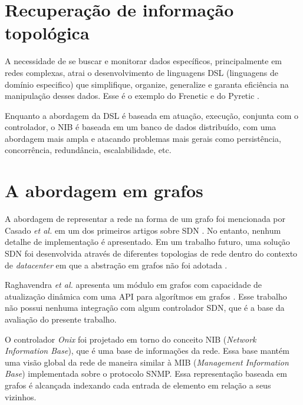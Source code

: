 \section{Recuperação de informação topológica}

A necessidade de se buscar e monitorar dados 
específicos, principalmente em redes complexas, atrai o desenvolvimento
de linguagens DSL (linguagens de domínio especifico) que simplifique, 
organize, generalize e garanta eficiência na manipulação desses dados.
Esse é o exemplo do Frenetic \citep{foster2011frenetic} 
e do Pyretic \citep{monsanto2013composing}.

Enquanto a abordagem da DSL é baseada em atuação, execução,
conjunta com o controlador,
o NIB é baseada em um banco de dados distribuído,
com uma abordagem mais ampla e atacando problemas mais gerais
como persistência, concorrência, redundância, escalabilidade, etc.

\section{A abordagem em grafos}

A abordagem de representar a rede na forma de um grafo foi mencionada 
por Casado \emph{et al.} em um dos primeiros artigos sobre SDN
\citep{martin2010virtualizing}.
No entanto, nenhum detalhe de implementação é apresentado.
Em um trabalho futuro, uma solução SDN foi desenvolvida através de 
diferentes topologias de rede dentro do contexto de \emph{datacenter} 
em que a abstração em grafos não foi adotada \citep{ripcord}. 

Raghavendra \emph{et al.} apresenta um módulo em grafos com capacidade 
de atualização dinâmica com uma API para algorítmos em grafos
\citep{ramya2012dynamic}.
Esse trabalho não possui nenhuma integração com algum controlador SDN,
que é a base da avaliação do presente trabalho.

O controlador \emph{Onix} \citep{teemu2010onix} foi projetado em torno do 
conceito NIB (\emph{Network Information Base}), que é uma base 
de informações da rede.
Essa base mantém uma visão global da rede de maneira similar à 
MIB (\emph{Management Information Base}) implementada sobre o
protocolo SNMP.
Essa representação baseada em grafos é alcançada indexando cada
entrada de elemento em relação a seus vizinhos.

